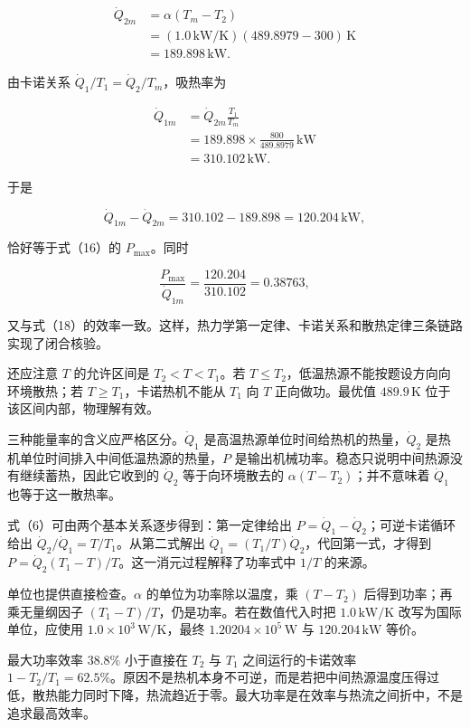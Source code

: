 \documentclass[12pt,a4paper,UTF8]{ctexart}
\begin{document}
\[
\begin{aligned}
\dot Q_{2m}
&=\alpha(T_m-T_2)\\
&=(1.0\,\mathrm{kW/K})(489.8979-300)\,\mathrm K\\
&=189.898\,\mathrm{kW}.
\end{aligned} \tag{23}
\]

由卡诺关系 \(\dot Q_1/T_1=\dot Q_2/T_m\)，吸热率为

\[
\begin{aligned}
\dot Q_{1m}
&=\dot Q_{2m}\frac{T_1}{T_m}\\
&=189.898\times\frac{800}{489.8979}\,\mathrm{kW}\\
&=310.102\,\mathrm{kW}. 
\end{aligned} \tag{24}
\]

于是

\[
\dot Q_{1m}-\dot Q_{2m}
=310.102-189.898
=120.204\,\mathrm{kW}, \tag{25}
\]

恰好等于式（16）的 \(P_{\max}\)。同时

\[
\frac{P_{\max}}{\dot Q_{1m}}
=\frac{120.204}{310.102}
=0.38763,
\]

又与式（18）的效率一致。这样，热力学第一定律、卡诺关系和散热定律三条链路实现了闭合核验。

还应注意 \(T\) 的允许区间是 \(T_2<T<T_1\)。若
\(T\leqslant T_2\)，低温热源不能按题设方向向环境散热；若
\(T\geqslant T_1\)，卡诺热机不能从 \(T_1\) 向 \(T\) 正向做功。最优值
\(489.9\,\mathrm K\) 位于该区间内部，物理解有效。

三种能量率的含义应严格区分。\(\dot Q_1\)
是高温热源单位时间给热机的热量，\(\dot Q_2\)
是热机单位时间排入中间低温热源的热量，\(P\)
是输出机械功率。稳态只说明中间热源没有继续蓄热，因此它收到的
\(\dot Q_2\) 等于向环境散去的 \(\alpha(T-T_2)\)；并不意味着 \(\dot Q_1\)
也等于这一散热率。

式（6）可由两个基本关系逐步得到：第一定律给出
\(P=\dot Q_1-\dot Q_2\)；可逆卡诺循环给出
\(\dot Q_2/\dot Q_1=T/T_1\)。从第二式解出
\(\dot Q_1=(T_1/T)\dot Q_2\)，代回第一式，才得到
\(P=\dot Q_2(T_1-T)/T\)。这一消元过程解释了功率式中 \(1/T\) 的来源。

单位也提供直接检查。\(\alpha\) 的单位为功率除以温度，乘 \((T-T_2)\)
后得到功率；再乘无量纲因子 \((T_1-T)/T\)，仍是功率。若在数值代入时把
\(1.0\,\mathrm{kW/K}\) 改写为国际单位，应使用
\(1.0\times10^3\,\mathrm{W/K}\)，最终 \(1.20204\times10^5\,\mathrm W\)
与 \(120.204\,\mathrm{kW}\) 等价。

最大功率效率 \(38.8\%\) 小于直接在 \(T_2\) 与 \(T_1\) 之间运行的卡诺效率
\(1-T_2/T_1=62.5\%\)。原因不是热机本身不可逆，而是若把中间热源温度压得过低，散热能力同时下降，热流趋近于零。最大功率是在效率与热流之间折中，不是追求最高效率。
\end{document}
